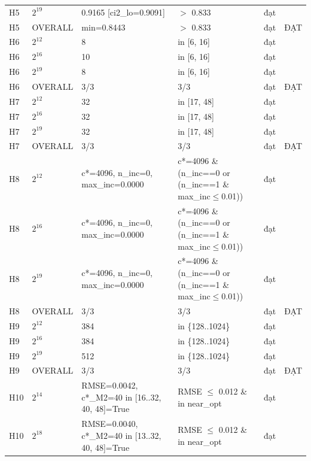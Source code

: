 \begin{longtable}{p{0.8cm}p{2.2cm}p{3.9cm}p{3.2cm}p{1.1cm}p{2.4cm}}
H5 & $2^{19}$ & 0.9165 [ci2\_\allowbreak{}lo=\allowbreak{}0.9091] & $>$\allowbreak{} 0.833 & đạt &  \\
H5 & OVERALL & min=\allowbreak{}0.8443 & $>$\allowbreak{} 0.833 & đạt & ĐẠT \\
H6 & $2^{12}$ & 8 & in [6, 16] & đạt &  \\
H6 & $2^{16}$ & 10 & in [6, 16] & đạt &  \\
H6 & $2^{19}$ & 8 & in [6, 16] & đạt &  \\
H6 & OVERALL & 3/3 & 3/3 & đạt & ĐẠT \\
H7 & $2^{12}$ & 32 & in [17, 48] & đạt &  \\
H7 & $2^{16}$ & 32 & in [17, 48] & đạt &  \\
H7 & $2^{19}$ & 32 & in [17, 48] & đạt &  \\
H7 & OVERALL & 3/3 & 3/3 & đạt & ĐẠT \\
H8 & $2^{12}$ & c*=\allowbreak{}4096, n\_\allowbreak{}inc=\allowbreak{}0, max\_\allowbreak{}inc=\allowbreak{}0.0000 & c*=4096 \& (n\_\allowbreak{}inc==0 or (n\_\allowbreak{}inc==1 \& max\_\allowbreak{}inc$\le$\allowbreak{}0.01)) & đạt &  \\
H8 & $2^{16}$ & c*=\allowbreak{}4096, n\_\allowbreak{}inc=\allowbreak{}0, max\_\allowbreak{}inc=\allowbreak{}0.0000 & c*=4096 \& (n\_\allowbreak{}inc==0 or (n\_\allowbreak{}inc==1 \& max\_\allowbreak{}inc$\le$\allowbreak{}0.01)) & đạt &  \\
H8 & $2^{19}$ & c*=\allowbreak{}4096, n\_\allowbreak{}inc=\allowbreak{}0, max\_\allowbreak{}inc=\allowbreak{}0.0000 & c*=4096 \& (n\_\allowbreak{}inc==0 or (n\_\allowbreak{}inc==1 \& max\_\allowbreak{}inc$\le$\allowbreak{}0.01)) & đạt &  \\
H8 & OVERALL & 3/3 & 3/3 & đạt & ĐẠT \\
H9 & $2^{12}$ & 384 & in \{128..1024\} & đạt &  \\
H9 & $2^{16}$ & 384 & in \{128..1024\} & đạt &  \\
H9 & $2^{19}$ & 512 & in \{128..1024\} & đạt &  \\
H9 & OVERALL & 3/3 & 3/3 & đạt & ĐẠT \\
H10 & $2^{14}$ & RMSE=\allowbreak{}0.0042, c*\_\allowbreak{}M2=\allowbreak{}40 in [16..32, 40, 48]=\allowbreak{}True & RMSE $\le$\allowbreak{} 0.012 \& in near\_\allowbreak{}opt & đạt &  \\
H10 & $2^{18}$ & RMSE=\allowbreak{}0.0040, c*\_\allowbreak{}M2=\allowbreak{}40 in [13..32, 40, 48]=\allowbreak{}True & RMSE $\le$\allowbreak{} 0.012 \& in near\_\allowbreak{}opt & đạt &  \\

\end{longtable}
